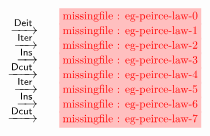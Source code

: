 \setlength{\fboxsep}{2pt}
\setlength{\arraycolsep}{0pt}
\newcommand{\vsp}{\vspace{-0.5em}}
\newcommand{\stkf}{\tikzfig{0.8}{0.4}}
$$
\begin{array}{r@{\quad}c@{\vsp}}
                             &\stkf{eg-peirce-law-0} \\
       \xstep{\mathsf{Deit}} &\stkf{eg-peirce-law-1} \\
       \xstep{\mathsf{Iter}} &\stkf{eg-peirce-law-2} \\
       \xstep{\mathsf{Ins}}  &\stkf{eg-peirce-law-3} \\
       \xstep{\mathsf{Dcut}} &\stkf{eg-peirce-law-4} \\
       \xstep{\mathsf{Iter}} &\stkf{eg-peirce-law-5} \\
       \xstep{\mathsf{Ins}}  &\stkf{eg-peirce-law-6} \\
       \xstep{\mathsf{Dcut}} &\stkf{eg-peirce-law-7} \\
\end{array}
$$
